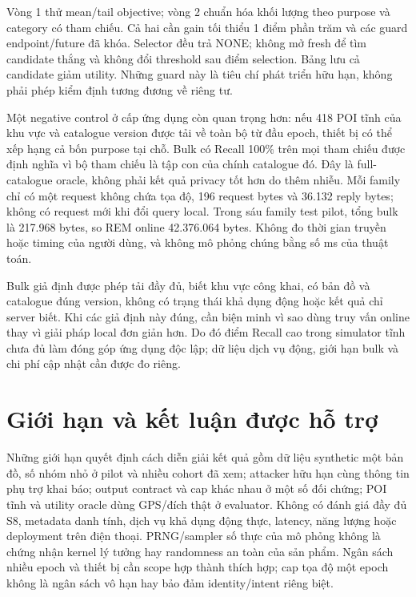 Vòng 1 thử mean/tail objective; vòng 2 chuẩn hóa khối lượng theo purpose và
category có tham chiếu. Cả hai cần gain tối thiểu 1 điểm phần trăm và các
guard endpoint/future đã khóa. Selector đều trả NONE; không mở fresh để tìm
candidate thắng và không đổi threshold sau điểm selection. Bảng lưu cả
candidate giảm utility. Những guard này là tiêu chí phát triển hữu hạn,
không phải phép kiểm định tương đương về riêng tư.

Một negative control ở cấp ứng dụng còn quan trọng hơn: nếu 418 POI tĩnh
của khu vực và catalogue version được tải về toàn bộ từ đầu epoch, thiết bị
có thể xếp hạng cả bốn purpose tại chỗ. Bulk có Recall 100\% trên mọi tham
chiếu được định nghĩa vì bộ tham chiếu là tập con của chính catalogue đó.
Đây là full-catalogue oracle, không phải kết quả privacy tốt hơn do thêm nhiễu.
Mỗi family chỉ có một request không chứa tọa độ, 196 request bytes và 36.132
reply bytes; không có request mới khi đổi query local. Trong sáu family test
pilot, tổng bulk là 217.968 bytes, so REM online 42.376.064 bytes. Không đo
thời gian truyền hoặc timing của người dùng, và không mô phỏng chúng bằng
số ms của thuật toán.

Bulk giả định được phép tải đầy đủ, biết khu vực công khai, có bản đồ và
catalogue đúng version, không có trạng thái khả dụng động hoặc kết quả chỉ
server biết. Khi các giả định này đúng, cần biện minh vì sao dùng truy vấn
online thay vì giải pháp local đơn giản hơn. Do đó điểm Recall cao trong
simulator tĩnh chưa đủ làm đóng góp ứng dụng độc lập; dữ liệu dịch vụ động,
giới hạn bulk và chi phí cập nhật cần được đo riêng.



\section{Giới hạn và kết luận được hỗ trợ}
\label{sec:current-evaluation-limits}

Những giới hạn quyết định cách diễn giải kết quả gồm dữ liệu synthetic một
bản đồ, số nhóm nhỏ ở pilot và nhiều cohort đã xem; attacker hữu hạn cùng
thông tin phụ trợ khai báo; output contract và cap khác nhau ở một số đối
chứng; POI tĩnh và utility oracle dùng GPS/đích thật ở evaluator. Không có
đánh giá đầy đủ S8, metadata danh tính, dịch vụ khả dụng động thực, latency,
năng lượng hoặc deployment trên điện thoại. PRNG/sampler số thực của mô
phỏng không là chứng nhận kernel lý tưởng hay randomness an toàn của sản phẩm.
Ngân sách nhiều epoch và thiết bị cần scope hợp thành thích hợp; cap tọa độ
một epoch không là ngân sách vô hạn hay bảo đảm identity/intent riêng biệt.

